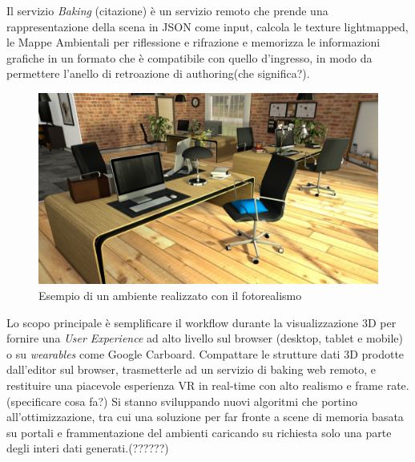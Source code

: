 Il servizio \emph{Baking} (citazione) \`e un servizio remoto che prende una rappresentazione della scena in JSON come input,
calcola le texture lightmapped, le Mappe Ambientali per riflessione e rifrazione e memorizza le informazioni grafiche
in un formato che \`e compatibile con quello d'ingresso, in modo da permettere l'anello di retroazione di authoring(che significa?).\\

\begin{figure}[htbp] %
   \centering
   \includegraphics[width=1\linewidth]{images/explorer-a-1}
   \caption{Esempio di un ambiente realizzato con il fotorealismo}
   \label{fig:revit}
   \end{figure}

Lo scopo principale \`e semplificare il workflow durante la visualizzazione 3D per fornire una \emph{User Experience}
ad alto livello sul browser (desktop, tablet e mobile) o su \emph{wearables} come Google Carboard.
Compattare le strutture dati 3D prodotte dall'editor sul browser, trasmetterle ad un servizio di baking web remoto,
e restituire una piacevole esperienza VR in real-time con alto realismo e frame rate. (specificare cosa fa?)
Si stanno sviluppando nuovi algoritmi che portino all'ottimizzazione,
tra cui una soluzione per far fronte a scene di memoria basata su portali e frammentazione del ambienti caricando
su richiesta solo una parte degli interi dati generati.(??????)

